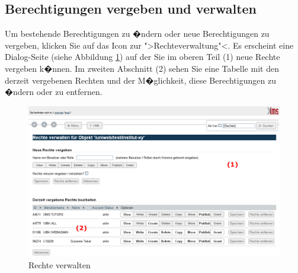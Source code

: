 \subsection{Berechtigungen vergeben und verwalten}
\label{berechtigungen-benutzer}
Um bestehende Berechtigungen zu �ndern oder neue Berechtigungen zu vergeben, klicken Sie auf das Icon zur ">Rechteverwaltung"<. Es erscheint eine Dialog-Seite (siehe Abbildung \ref{fig:manage-acl}) auf der Sie im oberen Teil (1) neue Rechte vergeben k�nnen. Im zweiten Abschnitt (2) sehen Sie eine Tabelle mit den derzeit vergebenen Rechten und der M�glichkeit, diese Berechtigungen zu �ndern oder zu entfernen.

\begin{figure}[!ht]
	\centering
		\includegraphics[width=\textwidth]{./images/manage-acl2.png}
	\caption{Rechte verwalten}
	\label{fig:manage-acl}
\end{figure}

